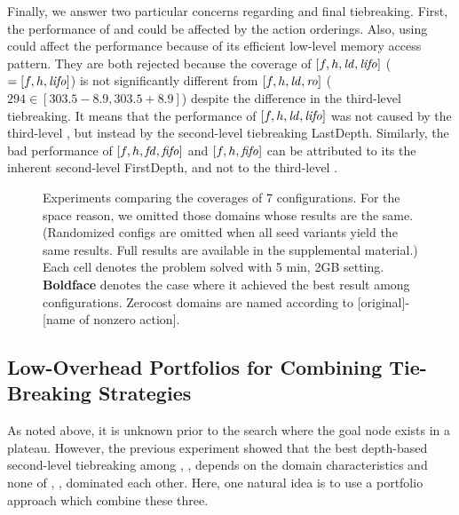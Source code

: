 Finally, we answer two particular concerns regarding \lifo and \fifo
final tiebreaking.  First, the performance of \lifo and \fifo could be
affected by the action orderings. Also, using \lifo could affect the
performance because of its efficient low-level memory access pattern.
They are both rejected because the coverage of $[f,h,\mbox{\textit{ld}},\mbox{\textit{lifo}}]$ ($=
[f,h,\mbox{\textit{lifo}}]$) is not significantly different from $[f,h,\mbox{\textit{ld}},\mbox{\textit{ro}}]$ ($294
\in [303.5-8.9,303.5+8.9]$) despite the difference in the third-level
tiebreaking. It means that the performance of $[f,h,\mbox{\textit{ld}},\mbox{\textit{lifo}}]$ was not
caused by the third-level \lifo, but instead by the second-level
tiebreaking LastDepth.  Similarly, the bad performance of
$[f,h,\mbox{\textit{fd}},\mbox{\textit{fifo}}]$ and $[f,h,\mbox{\textit{fifo}}]$ can be attributed to its the
inherent second-level FirstDepth, and not to the third-level \fifo.


\begin{figure}[tb]
 \centering
 
 \caption{Experiments comparing the coverages of 7 configurations. For
 the space reason, we omitted those domains whose results are the
 same. (Randomized configs are omitted when all seed variants yield the
 same results. Full results are available in the supplemental material.)
 Each cell denotes the problem solved with 5 min, 2GB
 setting. \textbf{Boldface} denotes the case where it achieved the best
 result among configurations. Zerocost domains are named according to
 [original]-[name of nonzero action].}  \label{depth}
\end{figure}

\subsection{Low-Overhead Portfolios for Combining Tie-Breaking Strategies}

As noted above, it is unknown prior to the search where the goal node
exists in a plateau. However, the previous experiment showed that the
best depth-based second-level tiebreaking among \ld, \fd, \rd depends on
the domain characteristics and none of \ld, \fd, \rd dominated each
other.  Here, one natural idea is to use a portfolio approach which
combine these three.

